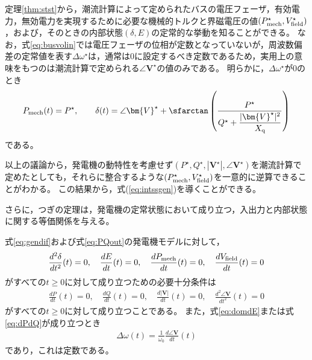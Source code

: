 \documentclass[tombow,dvipdfmx]{corona-a5-1.1}
\begin{document}
定理\ref{thm:stst}から，潮流計算によって定められたバスの電圧フェーザ，有効電力，無効電力を実現するために必要な機械的トルクと界磁電圧の値$(P_{\rm mech}^{\star},V_{\rm field}^{\star})$，および，そのときの内部状態$(\delta,E)$の定常的な挙動を知ることができる。
なお，式\ref{eq:busvolin}では電圧フェーザの位相が定数となっていないが，周波数偏差の定常値を表す$\Delta \omega^{\star}$は，通常は0に設定するべき定数であるため，実用上の意味をもつのは潮流計算で定められる$\angle \bm{V}^{\star}$の値のみである。
明らかに，$\Delta \omega^{\star}$が0のとき
\begin{align*}
P_{{\rm mech}}(t) =    P^{\star},\qquad
\delta (t)  = \angle \bm{V}^{\star}
+ \sfarctan \left( \frac{P^{\star}}{Q^{\star} + \frac{ |\bm{V}^{\star}|^2}{X_{\rm q}} } \right)
\end{align*}
である。

以上の議論から，発電機の動特性を考慮せず$(P^{\star},Q^{\star},|\bm{V}^{\star}|,\angle \bm{V}^{\star})$を潮流計算で定めたとしても，それらに整合するような$(P_{\rm mech}^{\star},V_{\rm field}^{\star})$を一意的に逆算できることがわかる。
この結果から，式(\ref{eq:intssgen})を導くことができる。

さらに，つぎの定理は，発電機の定常状態において成り立つ，入出力と内部状態に関する等価関係を与える。

\begin{定理}[発電機の入出力と内部状態に関する等価関係]
\label{thm:outst}
式\ref{eq:gendif}および式\ref{eq:PQout}の発電機モデルに対して，
\begin{align}\label{eq:domdE}
\frac{d^2 \delta}{dt^2}(t)=0
,\quad
\frac{dE}{dt}(t)=0
,\quad
\frac{d P_{\rm mech}}{dt}(t)=0
,\quad
\frac{d V_{\rm field}}{dt}(t)=0
\end{align}
がすべての$t\geq0$に対して成り立つための必要十分条件は
\begin{align}\label{eq:dPdQ}
\frac{dP}{dt}(t)=0
,\quad
\frac{dQ}{dt}(t)=0
,\quad
\frac{d|\bm{V}|}{dt}(t)=0
,\quad
\frac{d^2 \angle \bm{V}}{dt^2}(t)=0
\end{align}
がすべての$t\geq0$に対して成り立つことである。
また，式\ref{eq:domdE}または式\ref{eq:dPdQ}が成り立つとき
\begin{align}\label{eq:frer}
\Delta \omega(t)= \frac{1}{\omega_0}\frac{d \angle \bm{V}}{dt}(t)
\end{align}
であり，これは定数である。
\end{定理}
\end{document}

